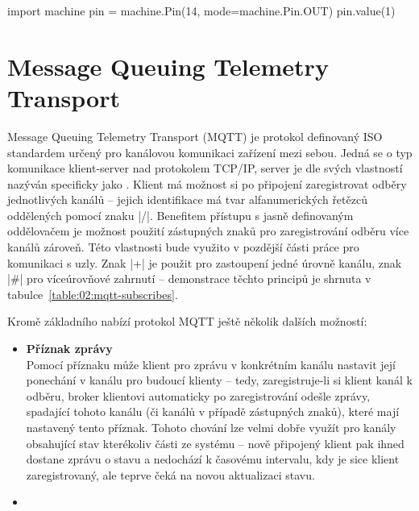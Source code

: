 \begin{code}
    import machine
    pin = machine.Pin(14, mode=machine.Pin.OUT)
    pin.value(1)
\end{code}


\section{Message Queuing Telemetry Transport}\label{sec:message-queuing-telemetry-transport}
Message Queuing Telemetry Transport (MQTT) je protokol definovaný ISO standardem určený pro kanálovou komunikaci zařízení
mezi sebou. Jedná se o typ komunikace klient-server nad protokolem TCP/IP, server je dle svých vlastností nazýván specificky
jako . Klient má možnost si po připojení zaregistrovat odběry jednotlivých kanálů -- jejich identifikace má tvar
alfanumerických řetězců oddělených pomocí znaku \ic|/|. Benefitem přístupu s jasně definovaným oddělovačem je možnost použití zástupných znaků pro
zaregistrování odběru více kanálů zároveň. Této vlastnosti bude využito v pozdější části práce pro komunikaci s uzly. Znak \ic|+|
je použit pro zastoupení jedné úrovně kanálu, znak \ic|#| pro víceúrovňové zahrnutí -- demonstrace těchto principů je shrnuta v
tabulce~\ref{table:02:mqtt-subscribes}.

Kromě základního nabízí protokol MQTT ještě několik dalších možností:

\begin{itemize}
    \item \textbf{Příznak zprávy } \\
        Pomocí příznaku  může klient pro zprávu v konkrétním kanálu nastavit její ponechání v kanálu pro budoucí klienty
        -- tedy, zaregistruje-li si klient kanál k odběru, broker klientovi automaticky po zaregistrování odešle zprávy,
        spadající tohoto kanálu (či kanálů v případě zástupných znaků), které mají nastavený tento příznak. Tohoto chování lze
        velmi dobře využít pro kanály obsahující stav kterékoliv části ze systému -- nově připojený klient pak ihned dostane zprávu
        o stavu a nedochází k časovému intervalu, kdy je sice klient zaregistrovaný, ale teprve čeká na novou aktualizaci stavu.

    \item
\end{itemize}

